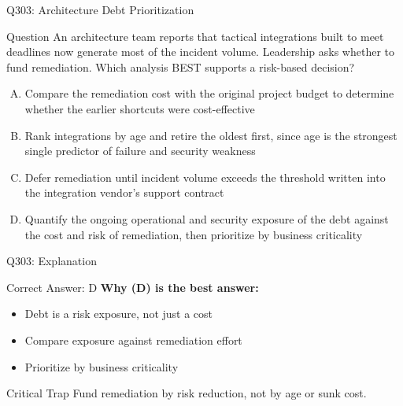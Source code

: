 \documentclass{beamer}
\begin{document}
	\begin{frame}{Q303: Architecture Debt Prioritization}
		\begin{block}{Question}
			\small An architecture team reports that tactical integrations built to meet deadlines now generate most of the incident volume. Leadership asks whether to fund remediation. Which analysis BEST supports a risk-based decision?
		\end{block}
		\begin{enumerate}[(A)]
			\footnotesize
			\item Compare the remediation cost with the original project budget to determine whether the earlier shortcuts were cost-effective
			\item Rank integrations by age and retire the oldest first, since age is the strongest single predictor of failure and security weakness
			\item Defer remediation until incident volume exceeds the threshold written into the integration vendor's support contract
			\item Quantify the ongoing operational and security exposure of the debt against the cost and risk of remediation, then prioritize by business criticality
		\end{enumerate}
	\end{frame}
	
	\begin{frame}{Q303: Explanation}
		\begin{block}{Correct Answer: D}
			\textbf{Why (D) is the best answer:}
			\begin{itemize}
				\item Debt is a risk exposure, not just a cost
				\item Compare exposure against remediation effort
				\item Prioritize by business criticality
			\end{itemize}
		\end{block}
		\begin{alertblock}{Critical Trap}
			Fund remediation by risk reduction, not by age or sunk cost.
		\end{alertblock}
	\end{frame}
	
\end{document}
